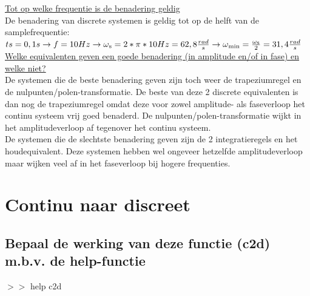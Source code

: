 \documentclass[a4paper, 12pt]{article}
\begin{document}
\underline{Tot op welke frequentie is de benadering geldig}\\
De benadering van discrete systemen is geldig tot op de helft van de samplefrequentie: \\
$ts = 0,1s \rightarrow f = 10Hz \rightarrow \omega\textsubscript{s} = 2 * \pi *10Hz = 62,8\frac{rad}{s} \rightarrow \omega\textsubscript{min} = \frac{\omega\textsubscript{s}}{2} = 31,4\frac{rad}{s}$ \\

\underline{Welke equivalenten geven een goede benadering (in amplitude en/of in fase) en welke niet?}\\
De systemen die de beste benadering geven zijn toch weer de trapeziumregel en de nulpunten/polen-transformatie. De beste van deze 2 discrete equivalenten is dan nog de trapeziumregel omdat deze voor zowel amplitude- als faseverloop het continu systeem vrij goed benaderd. De nulpunten/polen-transformatie wijkt in het amplitudeverloop af tegenover het continu systeem. \\
De systemen die de slechtste benadering geven zijn de 2 integratieregels en het houdequivalent. Deze systemen hebben wel ongeveer hetzelfde amplitudeverloop maar wijken veel af in het faseverloop bij hogere frequenties.

\section{Continu naar discreet}

\subsection{Bepaal de werking van deze functie (c2d) m.b.v. de help-functie}

$>>$ help c2d
\end{document}
